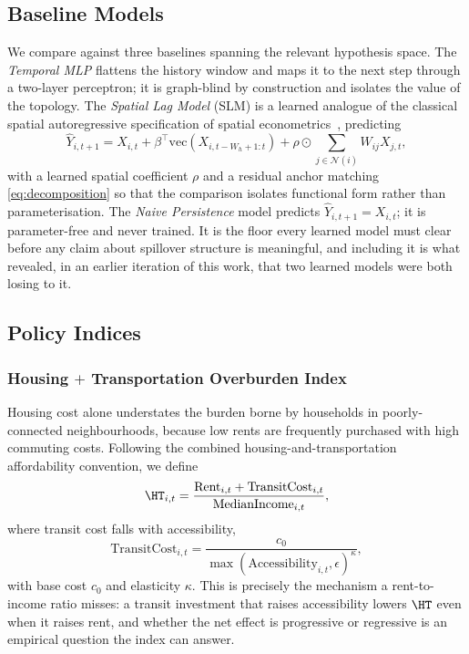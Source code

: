 \subsection{Baseline Models}

We compare against three baselines spanning the relevant hypothesis space.
The \emph{Temporal MLP} flattens the history window and maps it to the next
step through a two-layer perceptron; it is graph-blind by construction and
isolates the value of the topology. The \emph{Spatial Lag Model} (SLM) is a
learned analogue of the classical spatial autoregressive specification of
spatial econometrics~\cite{anselin1988,lesage2009}, predicting
\begin{equation}
  \hat{Y}_{i,t+1} = X_{i,t} + \beta^{\top} \mathrm{vec}(X_{i,t-W_h+1:t})
  + \rho \odot \sum_{j \in \mathcal{N}(i)} W_{ij} X_{j,t},
  \label{eq:slm}
\end{equation}
with a learned spatial coefficient $\rho$ and a residual anchor matching
\eqref{eq:decomposition} so that the comparison isolates functional form rather
than parameterisation. The \emph{Naive Persistence} model predicts
$\hat{Y}_{i,t+1} = X_{i,t}$; it is parameter-free and never trained. It is the
floor every learned model must clear before any claim about spillover structure
is meaningful, and including it is what revealed, in an earlier iteration of
this work, that two learned models were both losing to it.

\subsection{Policy Indices}

\subsubsection{Housing $+$ Transportation Overburden Index}

Housing cost alone understates the burden borne by households in
poorly-connected neighbourhoods, because low rents are frequently purchased
with high commuting costs. Following the combined housing-and-transportation
affordability convention, we define
\begin{equation}
  \HT_{i,t}
  = \frac{\mathrm{Rent}_{i,t} + \mathrm{TransitCost}_{i,t}}
         {\mathrm{MedianIncome}_{i,t}} ,
  \label{eq:ht}
\end{equation}
where transit cost falls with accessibility,
\begin{equation}
  \mathrm{TransitCost}_{i,t} =
  \frac{c_0}{\max(\mathrm{Accessibility}_{i,t}, \epsilon)^{\kappa}} ,
  \label{eq:transit}
\end{equation}
with base cost $c_0$ and elasticity $\kappa$. This is precisely the mechanism a
rent-to-income ratio misses: a transit investment that raises accessibility
lowers $\HT$ even when it raises rent, and whether the net effect is
progressive or regressive is an empirical question the index can answer.

